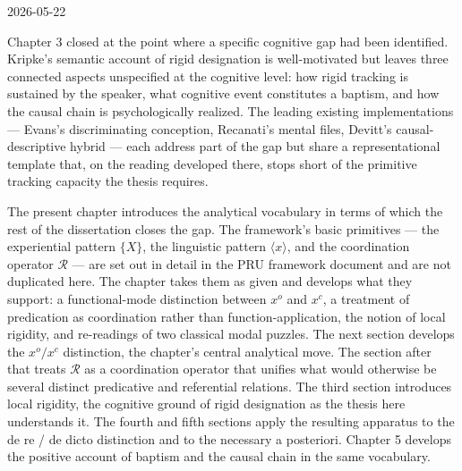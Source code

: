 \documentclass[10pt]{article}
\newlength{\notesmargin}
\begin{document}

\noindent\begin{minipage}{\dimexpr\textwidth+\notesmargin\relax}

  \hfill{\sffamily\normalsize 2026-05-22}

    \vspace{2pt}
  
  \vspace{4pt}
  \noindent{\color{ruleColor}\rule{\linewidth}{0.35pt}}

\end{minipage}

\vspace{3pt}

Chapter 3 closed at the point where a specific cognitive gap had been identified. Kripke's semantic account of rigid designation is well-motivated but leaves three connected aspects unspecified at the cognitive level: how rigid tracking is sustained by the speaker, what cognitive event constitutes a baptism, and how the causal chain is psychologically realized. The leading existing implementations --- Evans's discriminating conception, Recanati's mental files, Devitt's causal-descriptive hybrid --- each address part of the gap but share a representational template that, on the reading developed there, stops short of the primitive tracking capacity the thesis requires.

The present chapter introduces the analytical vocabulary in terms of which the rest of the dissertation closes the gap. The framework's basic primitives --- the experiential pattern \(\{X\}\), the linguistic pattern \(\langle x \rangle\), and the coordination operator \(\mathcal{R}\) --- are set out in detail in the PRU framework document and are not duplicated here. The chapter takes them as given and develops what they support: a functional-mode distinction between \(x^o\) and \(x^c\), a treatment of predication as coordination rather than function-application, the notion of local rigidity, and re-readings of two classical modal puzzles. The next section develops the \(x^o/x^c\) distinction, the chapter's central analytical move. The section after that treats \(\mathcal{R}\) as a coordination operator that unifies what would otherwise be several distinct predicative and referential relations. The third section introduces local rigidity, the cognitive ground of rigid designation as the thesis here understands it. The fourth and fifth sections apply the resulting apparatus to the de re / de dicto distinction and to the necessary a posteriori. Chapter 5 develops the positive account of baptism and the causal chain in the same vocabulary.
\end{document}
